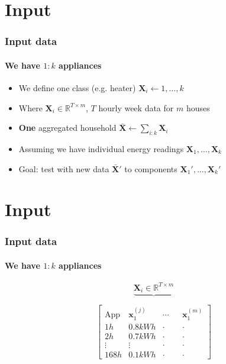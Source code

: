 \documentclass[gray]{beamer}
\begin{document}
\section{Input}
\begin{frame}
\frametitle{Input data}
\framesubtitle{We have $1:k$ appliances}
\begin{itemize}
\item{We define one class (e.g. heater) $\mathbf{X}_i \leftarrow 1,\dots, k$}
\item{Where $\mathbf{X}_i \in \mathbb{R}^{T \times m}$, $T$ hourly week data for $m$ houses}
\item{\textbf{One} aggregated household $\bar{\mathbf{X}} \leftarrow \sum_{i:k} \mathbf{X}_i$}
\item{Assuming we have individual energy readings $\mathbf{X}_1,\dots,\mathbf{X}_k$}
\item{Goal: test with new data $\bar{\mathbf{X}}'$ to components $\mathbf{X}_1',\dots,\mathbf{X}_k'$}
\end{itemize}
\end{frame}
\section{Input}
\begin{frame}
\frametitle{Input data}
\framesubtitle{We have $1:k$ appliances}
\begin{equation*}
\underbrace{\mathbf{X}_i \in \mathbb{R}^{T \times m}}
\end{equation*}

\begin{equation*}
\begin{bmatrix}
\text{App} & \mathbf{x}_1^{(j)} & \cdots & & \mathbf{x}_1^{(m)}\\
1h & 0.8 kWh & \cdot & & \cdot \\
2h & 0.7 kWh & \cdot & & \cdot \\
\vdots & \vdots & \cdot & & \cdot \\
168h & 0.1kWh & \cdot & &  \cdot
\end{bmatrix}
\end{equation*}
\end{frame}
\end{document}
